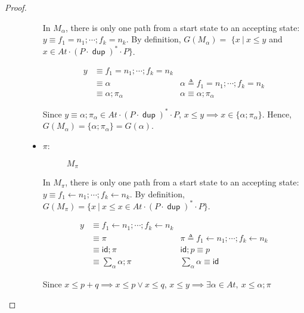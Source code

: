 \documentclass{article}
\newcommand\At{\ensuremath{\mathit{At}}}
\newcommand\pdup{\mathop{\mathsf{dup}}}
\renewcommand\star{^{\textstyle *}}
\newcommand\id{\mathsf{id}}
\newcommand\JI{\At\cdot(P\cdot\pdup)\star\cdot P}
\begin{document}
\begin{proof}
\begin{description}
\begin{itemize}
  In $M_\alpha$, there is only one path from a start state to an accepting 
  state: $y\equiv f_1=n_1;\cdots;f_k=n_k$. By definition, $G(M_\alpha) = $
  $\{x\ |\ x\leq y$ and $x \in \JI \}$.
  
  \begin{align*}
  y &\equiv f_1=n_1;\cdots;f_k=n_k \\
    &\equiv \alpha & \alpha \triangleq f_1=n_1;\cdots;f_k=n_k \\
    &\equiv \alpha;\pi_{\alpha} & \alpha \equiv \alpha;\pi_\alpha
  \end{align*}

  Since $y \equiv \alpha;\pi_{\alpha} \in \JI$, 
  $x \leq y \implies x \in \{\alpha;\pi_\alpha\}$. Hence, 
  $G(M_\alpha) = \{\alpha;\pi_\alpha\} = G(\alpha)$.

  \item $\pi$:
  \begin{figure}[H]
    \centering
    \caption{$M_{\pi}$}
  \end{figure}
  
  In $M_\pi$, there is only one path from a start state to an accepting 
  state: $y\equiv f_1 \gets n_1;\cdots;f_k \gets n_k$. By definition, 
  $G(M_\pi) = \{x\ |\ x\leq x \in \JI \}$.
  
  \begin{align*}
  y &\equiv f_1 \gets n_1;\cdots;f_k \gets n_k \\
    &\equiv \pi & \pi \triangleq f_1 \gets n_1;\cdots;f_k \gets n_k \\
    &\equiv \id;\pi & \id;p \equiv p \\
    &\equiv \displaystyle \sum_\alpha \alpha;\pi & \displaystyle \sum_\alpha
      \alpha \equiv \id
  \end{align*}
  
  Since $x \leq p+q \implies x \leq p \vee x \leq q$, 
  $x \leq y \implies \exists \alpha \in At,\ x \leq \alpha;\pi$
  

\end{itemize}
\end{description}
\end{proof}
\end{document}
